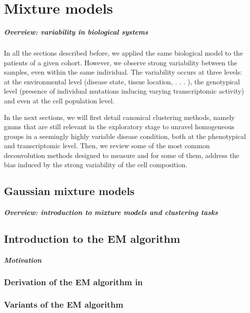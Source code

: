\chapter{Mixture models} 

\paragraph{Overview: variability in biological systems}

In all the sections described before, we applied the same biological model to the patients of a given cohort. However, we observe strong variability between the samples, even within the same individual. The variability occurs at three levels: at the environmental level (disease state, tissue location, . . . ), the genotypical level (presence of individual mutations inducing varying transcriptomic activity) and even at the cell population level. 

In the next sections, we will first detail canonical clustering methods, namely \Glspl{gmm} that are still relevant in the exploratory stage to unravel homogeneous groups in a seemingly highly variable disease condition, both at the phenotypical and transcriptomic level. Then, we review some of the most common deconvolution methods designed to measure and for some of them, address the bias induced by the strong variability of the cell composition.


\section{Gaussian mixture models}
\paragraph{Overview: introduction to mixture models and clustering tasks}

\section{Introduction to the EM algorithm}

\paragraph{Motivation}
\subsection{Derivation of the EM algorithm in }
\subsection{Variants of the EM algorithm}
